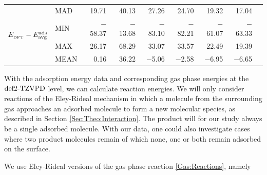 \documentclass[8.5pt,twoside,twocolumn]{article}
\newcommand\zpe{\enmat{\te{ZPE}}}
\newcommand\dft{\enmat{_{\te{DFT}}}}
\newcommand\gas{\enmat{_\te{(g)}}}
\newcommand{\fakefna}{\enmat{^a}}
\newcommand\kmo{\enmat{\te {kJ/mol}}}
\theoremstyle{standard}
\begin{document}
\begin{table}[htb]
\begin{tabular}{lll|rrrrrr|r}
    \hline \hline
\multicolumn{2}{r|}{\multirow{4}{*}{$E_{\dft} - \avg$}} &
                            MAD   & 19.71 & 40.13 & 27.26 & 24.70 & 19.32 & 17.04 &  \\
    \multicolumn{2}{r|}{} &  MIN   & $-$58.37 & $-$13.68 & $-$83.10 & $-$82.21 & $-$61.07 & $-$63.33 &  \\
    \multicolumn{2}{r|}{} &  MAX   & 26.17 & 68.29 & 33.07 & 33.57 & 22.49 & 19.39 &  \\
    \multicolumn{2}{r|}{} &  MEAN  & 0.16  & 36.22 & $-$5.06 & $-$2.58 & $-$6.95 & $-$6.65 &  \\[5pt]
%
%
    \end{tabular}%
  \label{Tab:Ads:React}%
\end{table}%


With the adsorption energy data and corresponding gas phase energies at the
$\text{def2-TZVPD}$ level, we can calculate reaction energies. We will only
consider reactions of the Eley-Rideal mechanism in which a molecule
from the surrounding gas approaches an adsorbed molecule to form
a new molecular species, as described in Section \ref{Sec:Theo:Interaction}.
The product will for our study always be a single adsorbed molecule. With our data,
one could also investigate cases where two product molecules remain
of which none, one or both remain adsorbed on the surface.

We use Eley-Rideal versions of the gas phase reaction \eqref{Gas:Reactions}, namely
\end{document}
